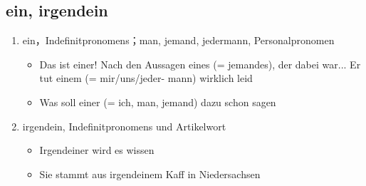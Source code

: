 \documentclass[UTF8]{report}
\begin{document}
\subsection{ein, irgendein}
\begin{enumerate}
    \item ein，Indefinitpronomens；man, jemand, jedermann, Personalpronomen
    \begin{itemize}
        \item  Das ist einer! Nach den Aussagen eines (= jemandes), der dabei war... Er tut einem (= mir/uns/jeder- mann) wirklich leid
        \item Was soll einer (= ich, man, jemand) dazu schon sagen
    \end{itemize}
    \item irgendein, Indefinitpronomens und Artikelwort
    \begin{itemize}
        \item Irgendeiner wird es wissen
        \item Sie stammt aus irgendeinem Kaff in Niedersachsen
    \end{itemize}
\end{enumerate}
\end{document}
